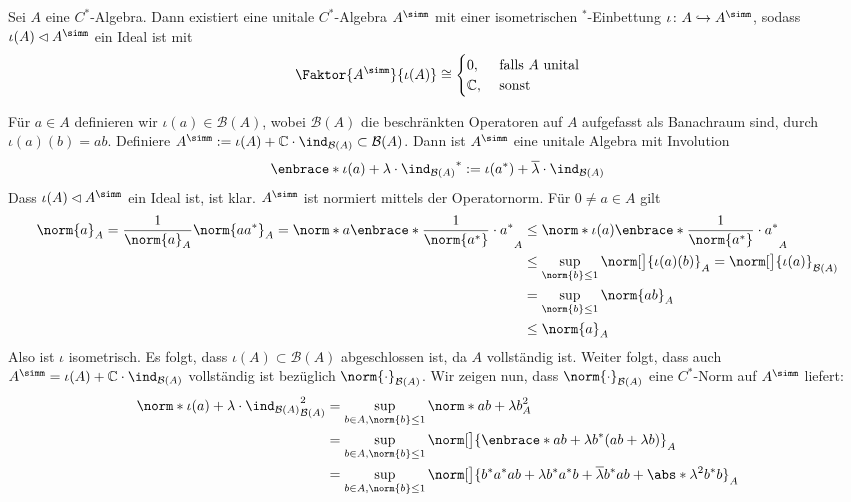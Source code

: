 \begin{satz}[label=satz:26,{name=[Unitalisierung]}]
	Sei $A$ eine $C^*$-Algebra. Dann existiert eine unitale $C^*$-Algebra $A^\simm$ mit einer isometrischen ${}^*$-Einbettung $\iota \colon A \hookrightarrow A^\simm$, sodass
	$\iota(A) \lhd A^\simm$ ein Ideal ist mit 
	\[
		\Faktor{A^\simm}{\iota(A)} \cong \begin{cases}
			0, &\text{ falls }A \text{ unital} \\
			\mathbb{C} , &\text{ sonst }  
		\end{cases}
	\]
\end{satz}
\begin{beweis}
	Für $a \in A$ definieren wir $\iota(a) \in \mathcal{B}(A)$, wobei $\mathcal{B}(A)$ die beschränkten Operatoren auf $A$ aufgefasst als Banachraum sind, durch
	$\iota(a)(b)=ab$. Definiere $A^\simm := \iota(A) + \mathbb{C} \cdot \ind_{\mathcal{B}(A)} \subset \mathcal{B}(A)$. Dann ist $A^\simm$ eine unitale Algebra mit Involution
	\[
		\enbrace*{\iota(a)+\lambda \cdot \ind_{\mathcal{B}(A)}}^* := \iota(a^*) + \overline{\lambda} \cdot \ind_{\mathcal{B}(A)}
	\]
	Dass $\iota(A) \lhd A^\simm$ ein Ideal ist, ist klar. $A^\simm$ ist normiert mittels der Operatornorm. Für $0 \neq a \in A$ gilt  
	\begin{align}
		\norm{a}_A = \frac{1}{\norm{a}_A}\norm{aa^*}_A = \norm*{a \enbrace*{\frac{1}{\norm{a^*} } \cdot a^*}}_A &\le \norm*{\iota(a) \enbrace*{\frac{1}{\norm{a^*}}\cdot a^* }}_A \\
		&\le \sup_{\norm{b} \le 1} \norm[\big]{\iota(a)(b)}_A = \norm[\big]{\iota(a)}_{\mathcal{B}(A)} \\
		&= \sup_{\norm{b} \le 1} \norm{ab}_A \\
		&\le \norm{a}_A   
	\end{align}
	Also ist $\iota$ isometrisch. Es folgt, dass $\iota(A) \subset \mathcal{B}(A)$ abgeschlossen ist, da $A$ vollständig ist. Weiter folgt, dass auch 
	$A^\simm = \iota(A) + \mathbb{C} \cdot \ind_{\mathcal{B}(A)}$ vollständig ist bezüglich $\norm{\cdot}_{\mathcal{B}(A)}$. Wir zeigen nun, dass $\norm{\cdot}_{\mathcal{B}(A)}$ 
	eine $C^*$-Norm auf $A^\simm$ liefert: 
	\begin{align}
		\norm*{\iota(a)+ \lambda \cdot \ind_{\mathcal{B}(A)}}_{\mathcal{B}(A)}^2 &= \sup_{b \in A, \norm{b} \le 1 } \norm*{ab + \lambda b}^2_A \\
		&= \sup_{b \in A, \norm{b} \le 1} \norm[\big]{\enbrace*{ab+\lambda b}^* (ab +\lambda b)}_A \\
		&= \sup_{b \in A, \norm{b} \le 1} \norm[\big]{b^* a^* ab + \lambda b^* a^* b + \overline{\lambda} b^* ab + \abs*{\lambda}^2 b^* b}_{A} \\

\end{align}
\end{beweis}
